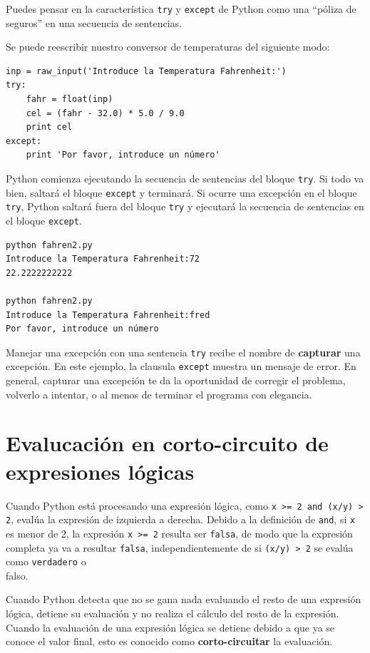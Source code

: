 Puedes pensar en la característica {\tt try} y {\tt except}
de Python como una ``póliza de seguros'' en una secuencia
de sentencias.

Se puede reescribir nuestro conversor de temperaturas del siguiente modo:

\beforeverb
\begin{verbatim}
inp = raw_input('Introduce la Temperatura Fahrenheit:')
try:
    fahr = float(inp)
    cel = (fahr - 32.0) * 5.0 / 9.0
    print cel
except:
    print 'Por favor, introduce un número'
\end{verbatim}
\afterverb
%

Python comienza ejecutando la
secuencia de sentencias del bloque
{\tt try}. Si todo va bien,
saltará el bloque {\tt except} y terminará.
Si ocurre una excepción en el bloque {\tt try},
Python saltará fuera del bloque {\tt try} y
ejecutará la secuencia de sentencias en el bloque {\tt except}.

\beforeverb
\begin{verbatim}
python fahren2.py 
Introduce la Temperatura Fahrenheit:72
22.2222222222

python fahren2.py 
Introduce la Temperatura Fahrenheit:fred
Por favor, introduce un número
\end{verbatim}
\afterverb
%

Manejar una excepción con una sentencia {\tt try} recibe el nombre de
{\bf capturar} una excepción. En este ejemplo, la clausula {\tt except}
muestra un mensaje de error. En general,
capturar una excepción te da la oportunidad de corregir el problema,
volverlo a intentar, o al menos de terminar el programa con elegancia.

\section{Evalucación en corto-circuito de expresiones lógicas}

Cuando Python está procesando una expresión lógica, como
{\tt x >= 2 and (x/y) > 2}, evalúa la expresión de
izquierda a derecha. Debido a la definición de {\tt and},
si {\tt x} es menor de 2, la expresión {\tt x >= 2} resulta ser
{\tt falsa}, de modo que la expresión completa ya va a resultar {\tt falsa}, independientemente
de si {\tt (x/y) > 2} se evalúa como {\tt verdadero} o {\\ falso}.

Cuando Python detecta que no se gana nada evaluando
el resto de una expresión lógica, detiene su evaluación y no
realiza el cálculo del resto de la expresión.
Cuando la evaluación de una expresión lógica se detiene debido a que
ya se conoce el valor final, esto es conocido como {\bf corto-circuitar}
la evaluación.

